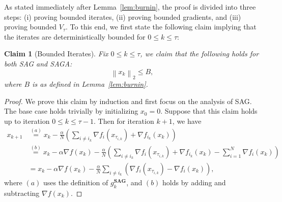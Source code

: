\documentclass{article}
\theoremstyle{plain}
\newtheorem{claim}[theorem]{Claim}
\theoremstyle{definition}
\newcommand{\norm}[1]{\left\| #1\right\|_{2}}
\newcommand{\paren}[1]{\left( #1\right)}
\begin{document}
As stated immediately after Lemma~\ref{lem:burnin}, the proof is divided into three steps: (i) proving bounded iterates, (ii) proving bounded gradients, and (iii) proving bounded $V_\tau$. To this end, we first state the following claim implying that the iterates are deterministically bounded for $0\leq k\leq \tau$:
\begin{claim}[Bounded Iterates]\label{claim1}
Fix $0\leq k\leq \tau$, we claim that the following holds for both SAG and SAGA:
\begin{equation}
    \norm{x_k}\leq B,
\end{equation}
where $B$ is as defined in Lemma~\ref{lem:burnin}. 
\end{claim}
\begin{proof}
We prove this claim by induction and first focus on the analysis of SAG. The base case holds trivially by initializing $x_0=0$. Suppose that this claim holds up to iteration $0\leq k\leq \tau-1$. Then for iteration $k+1$, we have
\begin{equation}
\begin{aligned}
        x_{k+1}&\overset{(a)}{=}x_k-\frac{\alpha}{N}\paren{\sum_{i\neq i_k}\nabla f_i(x_{\tau_{i,k}})+\nabla f_{i_k}(x_k)}\\
        &\overset{(b)}{=}x_k-\alpha\nabla f(x_k) -\frac{\alpha}{N}\paren{\sum_{i\neq i_k}\nabla f_i(x_{\tau_{i,k}})+\nabla f_{i_k}(x_k)-\sum_{i=1}^N\nabla f_i(x_k)}\\
        &=x_k-\alpha\nabla f(x_k)-\frac{\alpha}{N}\sum_{i\neq i_k}\paren{\nabla f_i(x_{\tau_{i,k}}) - \nabla f_i(x_k)},
\end{aligned}
\end{equation}
where $(a)$ uses the definition of $g_k^\textbf{SAG}$, and $(b)$ holds by adding and subtracting $\nabla f(x_k)$.


\end{proof}
\end{document}
